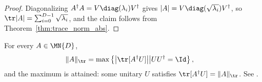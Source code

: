 \begin{proof}\leanok
    Diagonalizing $A^\dagger A=V\diag(\lambda_i)V^\dagger$ gives
    $\lvert A\rvert=V\diag(\sqrt{\lambda_i})V^\dagger$, so
    $\tr\lvert A\rvert=\sum_{i=0}^{D-1}\sqrt{\lambda_i}$,
    and the claim follows from Theorem~\ref{thm:trace_norm_abs}.
\end{proof}

\begin{theorem}
    \label{thm:trace_norm_variational}
    \leanok
    For every $A\in\MN{D}$,
    \begin{align}
        \lVert A\rVert_{\tr}
        &=\max\left\{\bigl|\tr[A^\dagger U]\bigr|
        \middle|  UU^\dagger=\Id\right\},
        \label{eq:entropy_trace_norm_variational}
    \end{align}
    and the maximum is attained: some unitary $U$ satisfies
    $\tr[A^\dagger U]=\lVert A\rVert_{\tr}$.
    See \cite[Chapter~8, Eq.~(8.11)]{Wolf2012Quantum}.
\end{theorem}

